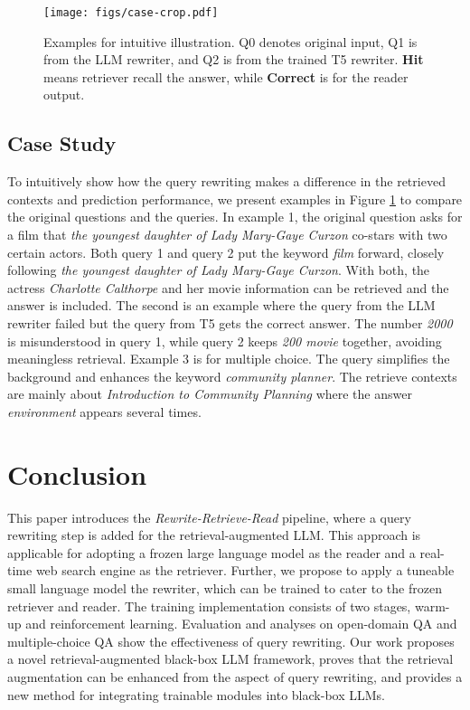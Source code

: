 \begin{figure}[t]
    \centering
    \setlength{\belowcaptionskip}{-0.3cm}
    \texttt{[image: figs/case-crop.pdf]}
    \caption{\label{case}Examples for intuitive illustration. Q0 denotes original input, Q1 is from the LLM rewriter, and Q2 is from the trained T5 rewriter. \textbf{Hit} means retriever recall the answer, while \textbf{Correct} is for the reader output.}
\end{figure}

\subsection{Case Study}
To intuitively show how the query rewriting makes a difference in the retrieved contexts and prediction performance, we present examples in Figure \ref{case} to compare the original questions and the queries.
In example 1, the original question asks for a film that \textit{the youngest daughter of Lady Mary-Gaye Curzon} co-stars with two certain actors.
Both query 1 and query 2 put the keyword \textit{film} forward, closely following \textit{the youngest daughter of Lady Mary-Gaye Curzon}. With both, the actress \textit{Charlotte Calthorpe} and her movie information can be retrieved and the answer is included.
The second is an example where the query from the LLM rewriter failed but the query from T5 gets the correct answer. The number \textit{2000} is misunderstood in query 1, while query 2 keeps \textit{200 movie} together, avoiding meaningless retrieval.
Example 3 is for multiple choice. The query simplifies the background and enhances the keyword \textit{community planner}. The retrieve contexts are mainly about \textit{Introduction to Community Planning} where the answer \textit{environment} appears several times.

\section{Conclusion}
This paper introduces the \textit{Rewrite-Retrieve-Read} pipeline, where a query rewriting step is added for the retrieval-augmented LLM. This approach is applicable for adopting a frozen large language model as the reader and a real-time web search engine as the retriever. Further, we propose to apply a tuneable small language model the rewriter, which can be trained to cater to the frozen retriever and reader. 
The training implementation consists of two stages, warm-up and reinforcement learning.
Evaluation and analyses on open-domain QA and multiple-choice QA show the effectiveness of query rewriting.
Our work proposes a novel retrieval-augmented black-box LLM framework, proves that the retrieval augmentation can be enhanced from the aspect of query rewriting, and
provides a new method for integrating trainable modules into black-box LLMs.

